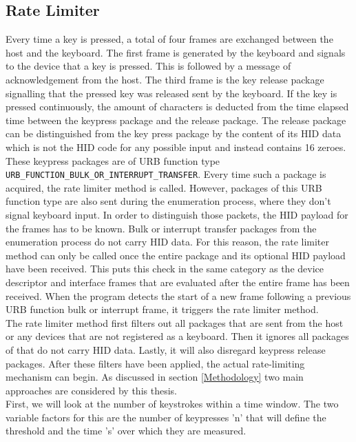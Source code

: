 \subsection{Rate Limiter}

Every time a key is pressed, a total of four frames are exchanged between the host and the keyboard. The first frame is generated by the keyboard and signals to the device that a key is pressed. This is followed by a message of acknowledgement from the host. The third frame is the key release package signalling that the pressed key was released sent by the keyboard. If the key is pressed continuously, the amount of characters is deducted from the time elapsed time between the keypress package and the release package. The release package can be distinguished from the key press package by the content of its HID data which is not the HID code for any possible input and instead contains 16 zeroes. \\
These keypress packages are of URB function type \verb|URB_FUNCTION_BULK_OR_INTERRUPT_TRANSFER|. Every time such a package is acquired, the rate limiter method is called. However, packages of this URB function type are also sent during the enumeration process, where they don't signal keyboard input. In order to distinguish those packets, the HID payload for the frames has to be known. Bulk or interrupt transfer packages from the enumeration process do not carry HID data. For this reason, the rate limiter method can only be called once the entire package and its optional HID payload have been received. This puts this check in the same category as the device descriptor and interface frames that are evaluated after the entire frame has been received. When the program detects the start of a new frame following a previous URB function bulk or interrupt frame, it triggers the rate limiter method. \\
The rate limiter method first filters out all packages that are sent from the host or any devices that are not registered as a keyboard. Then it ignores all packages of that do not carry HID data. Lastly, it will also disregard keypress release packages. After these filters have been applied, the actual rate-limiting mechanism can begin. As discussed in section \ref{Methodology} two main approaches are considered by this thesis. \\
First, we will look at the number of keystrokes within a time window. The two variable factors for this are the number of keypresses 'n' that will define the threshold and the time 's' over which they are measured. 
